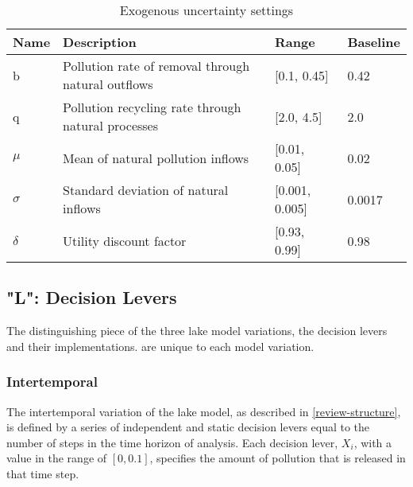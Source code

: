     \begin{table}[ht]
        \caption{Exogenous uncertainty settings}
        
        \label{table:uncertainties}
        
        \setlength\arrayrulewidth{1pt}
        \begin{tabularx}{\linewidth}{l|X|l|l}
            \rowcolor{tudelft-dark-blue!80}
            \color{white}\bfseries Name     &      \color{white}\bfseries Description   &
            \color{white}\bfseries Range    &      \color{white}\bfseries Baseline\\ \hline
            
            b               & Pollution rate of removal through natural outflows        & [0.1, 0.45]       & 0.42\\ \hline
            q               & Pollution recycling rate through natural processes        & [2.0, 4.5]        & 2.0\\ \hline
            $\mu$           & Mean of natural pollution inflows                         & [0.01, 0.05]      & 0.02\\ \hline
            $\sigma$        & Standard deviation of natural inflows                     & [0.001, 0.005]    & 0.0017\\ \hline
            $\delta$        & Utility discount factor                                   & [0.93, 0.99]      & 0.98\\
            
        \end{tabularx}
    \end{table}
    
    \subsection{"L": Decision Levers}\label{step1-L}
    The distinguishing piece of the three lake model variations, the decision levers and their implementations. are unique to each model variation. 

        \subsubsection{Intertemporal}
        The intertemporal variation of the lake model, as described in \cref{review-structure}, is defined by a series of independent and static decision levers equal to the number of steps in the time horizon of analysis. Each decision lever, $X_{i}$, with a value in the range of $[0, 0.1]$, specifies the amount of pollution that is released in that time step. 

